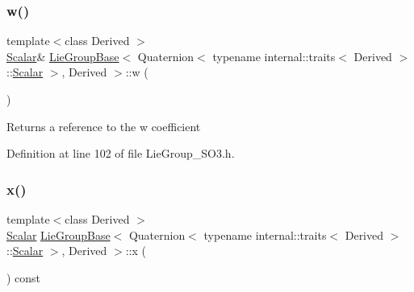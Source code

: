 \subsubsection{\texorpdfstring{w()}{w()}\hspace{0.1cm}{\footnotesize\ttfamily [2/2]}}
{\footnotesize\ttfamily template$<$class Derived $>$ \\
\hyperlink{class_lie_group_base_3_01_quaternion_3_01typename_01internal_1_1traits_3_01_derived_01_4_1_1_scalar_01_4_00_01_derived_01_4_afadeceb3b98e52deecc572e71efb82a8}{Scalar}\& \hyperlink{class_lie_group_base}{Lie\+Group\+Base}$<$ Quaternion$<$ typename internal\+::traits$<$ Derived $>$\+::\hyperlink{class_lie_group_base_3_01_quaternion_3_01typename_01internal_1_1traits_3_01_derived_01_4_1_1_scalar_01_4_00_01_derived_01_4_afadeceb3b98e52deecc572e71efb82a8}{Scalar} $>$, Derived $>$\+::w (\begin{DoxyParamCaption}{ }\end{DoxyParamCaption})\hspace{0.3cm}{\ttfamily [inline]}}

\begin{DoxyReturn}{Returns}
a reference to the {\ttfamily w} coefficient 
\end{DoxyReturn}


Definition at line 102 of file Lie\+Group\+\_\+\+S\+O3.\+h.

\hypertarget{class_lie_group_base_3_01_quaternion_3_01typename_01internal_1_1traits_3_01_derived_01_4_1_1_scalar_01_4_00_01_derived_01_4_aa9698c71b46a151129db41e5c5801251}{}\label{class_lie_group_base_3_01_quaternion_3_01typename_01internal_1_1traits_3_01_derived_01_4_1_1_scalar_01_4_00_01_derived_01_4_aa9698c71b46a151129db41e5c5801251} 
\subsubsection{\texorpdfstring{x()}{x()}\hspace{0.1cm}{\footnotesize\ttfamily [1/2]}}
{\footnotesize\ttfamily template$<$class Derived $>$ \\
\hyperlink{class_lie_group_base_3_01_quaternion_3_01typename_01internal_1_1traits_3_01_derived_01_4_1_1_scalar_01_4_00_01_derived_01_4_afadeceb3b98e52deecc572e71efb82a8}{Scalar} \hyperlink{class_lie_group_base}{Lie\+Group\+Base}$<$ Quaternion$<$ typename internal\+::traits$<$ Derived $>$\+::\hyperlink{class_lie_group_base_3_01_quaternion_3_01typename_01internal_1_1traits_3_01_derived_01_4_1_1_scalar_01_4_00_01_derived_01_4_afadeceb3b98e52deecc572e71efb82a8}{Scalar} $>$, Derived $>$\+::x (\begin{DoxyParamCaption}{ }\end{DoxyParamCaption}) const\hspace{0.3cm}{\ttfamily [inline]}}

